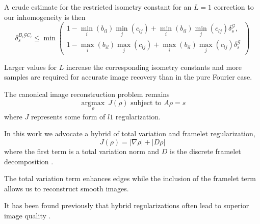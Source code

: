 \documentclass[xcolor=dvipsnames]{beamer}
\theoremstyle{remark}
\begin{document}
\begin{frame}
A crude estimate for the restricted isometry constant for an $L=1$ correction to our inhomogeneity is then
\begin{equation}
\delta_s^{B_l \mathcal{G} C_l} \leq \min \left( \begin{array}{l}1-\min_i(b_{il})\min_j(c_{lj}) + \min_i(b_{il})\min_j(c_{lj})\delta_s^{\mathcal{G}}, \\ 
1-\max_i(b_{il})\max_j(c_{lj}) + \max_i(b_{il})\max_j(c_{lj})\delta_s^{\mathcal{G}} \end{array} \right)
\end{equation}


Larger values for $L$ increase the corresponding isometry constants and more samples are required for accurate image recovery than in the pure Fourier case.
\end{frame}

\begin{frame}
The canonical image reconstruction problem remains
\begin{equation}\label{csequ}
\underset{\rho}{\operatorname{argmax}} \: J(\rho)  \text{ subject to } A \rho = s
\end{equation}
where $J$ represents some form of $l1$ regularization.

\end{frame}

\begin{frame}

In this work we advocate a hybrid of total variation and framelet regularization,
\begin{equation}
J(\rho) = | \nabla \rho| + | D \rho |
\end{equation}
where the first term is a total variation norm and $D$ is the discrete framelet decomposition \cite{Cai2008}.

The total variation term enhances edges while the inclusion of the framelet term allows us to reconstruct smooth images.

It has been found previously that hybrid regularizations often lead to superior image quality \cite{Goldstein2009a}.
\end{frame}
\end{document}
